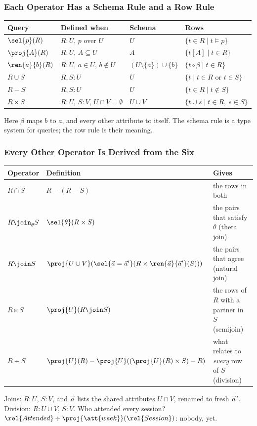 \begin{frame}
  \frametitle{Each Operator Has a Schema Rule and a Row Rule}
  {\centering\renewcommand{}
    {\headerrow\begin{tabular}{@{}l@{\quad}l@{\quad}l@{\quad}l@{}}
      \hline
      \textbf{Query} & \textbf{Defined when} & \textbf{Schema} &
        \textbf{Rows} \\ \hline
      $\sel{p}(R)$ & $R : U$, $p$ over $U$ & $U$ &
        $\{t \in R \mid t \models p\}$ \\
      $\proj{A}(R)$ & $R : U$, $A \subseteq U$ & $A$ &
        $\{t[A] \mid t \in R\}$ \\
      $\ren{a}{b}(R)$ & $R : U$, $a \in U$, $b \notin U$ &
        $(U \setminus \{a\}) \cup \{b\}$ & $\{t \circ \beta \mid t \in R\}$ \\
      $R \cup S$ & $R, S : U$ & $U$ &
        $\{t \mid t \in R \text{ or } t \in S\}$ \\
      $R - S$ & $R, S : U$ & $U$ & $\{t \in R \mid t \notin S\}$ \\
      $R \times S$ & $R : U$, $S : V$, $U \cap V = \emptyset$ & $U \cup V$ &
        $\{t \cup s \mid t \in R,\ s \in S\}$ \\ \hline
    \end{tabular}}\par}
  \medskip
  Here $\beta$ maps $b$ to $a$, and every other attribute to itself. The
  schema rule is a type system for queries; the row rule is their meaning.
  \crashtag
\end{frame}

\begin{frame}
  \frametitle{Every Other Operator Is Derived from the Six}
  {\centering\renewcommand{}
    {\headerrow\begin{tabular}{@{}l@{\quad}l@{\quad}l@{}}
      \hline
      \textbf{Operator} & \textbf{Definition} & \textbf{Gives} \\ \hline
      $R \cap S$ & $R - (R - S)$ & the rows in both \\
      $R \join_{\theta} S$ & $\sel{\theta}(R \times S)$ & the pairs that
        satisfy $\theta$ (theta join) \\
      $R \join S$ & $\proj{U \cup V}(\sel{\vec{a} = \vec{a}'}(R \times
        \ren{\vec{a}}{\vec{a}'}(S)))$ & the pairs that agree (natural join)
        \\
      $R \ltimes S$ & $\proj{U}(R \join S)$ & the rows of $R$ with a
        partner in $S$ (semijoin) \\
      $R \div S$ & $\proj{U}(R) - \proj{U}((\proj{U}(R) \times S) - R)$ &
        what relates to \emph{every} row of $S$ (division) \\ \hline
    \end{tabular}}\par}
  \medskip
  Joins: $R : U$, $S : V$, and $\vec{a}$ lists the shared attributes
  $U \cap V$, renamed to fresh $\vec{a}'$. Division: $R : U \cup V$,
  $S : V$. Who attended every session?
  $\rel{Attended} \div \proj{\att{week}}(\rel{Session})$: nobody, yet.
  \crashtag
\end{frame}

